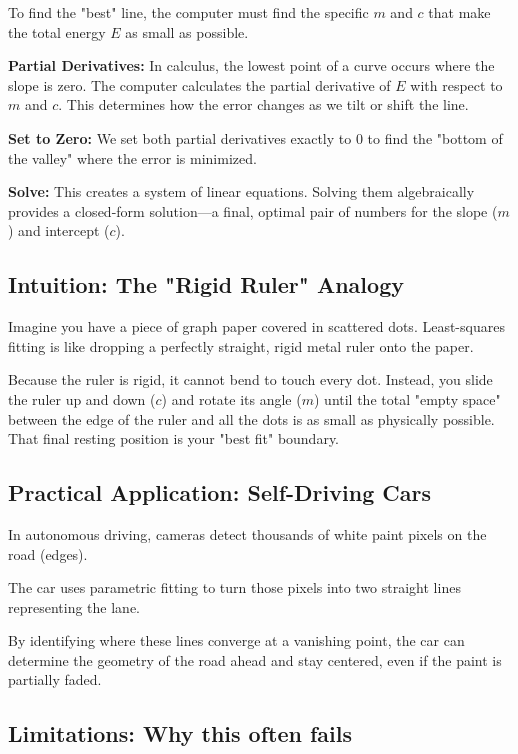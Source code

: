 \documentclass[12pt]{article}
\begin{document}
To find the "best" line, the computer must find the specific $m$ and $c$ that make the total energy $E$ as small as possible.

\textbf{Partial Derivatives:}
In calculus, the lowest point of a curve occurs where the slope is zero. The computer calculates the partial derivative of $E$ with respect to $m$ and $c$. This determines how the error changes as we tilt or shift the line.

\textbf{Set to Zero:}
We set both partial derivatives exactly to $0$ to find the "bottom of the valley" where the error is minimized.

\textbf{Solve:}
This creates a system of linear equations. Solving them algebraically provides a closed-form solution—a final, optimal pair of numbers for the slope ($m$) and intercept ($c$).


\subsection{Intuition: The "Rigid Ruler" Analogy}

Imagine you have a piece of graph paper covered in scattered dots. Least-squares fitting is like dropping a perfectly straight, rigid metal ruler onto the paper.

Because the ruler is rigid, it cannot bend to touch every dot. Instead, you slide the ruler up and down ($c$) and rotate its angle ($m$) until the total "empty space" between the edge of the ruler and all the dots is as small as physically possible. That final resting position is your "best fit" boundary.

\subsection{Practical Application: Self-Driving Cars}

In autonomous driving, cameras detect thousands of white paint pixels on the road (edges).

The car uses parametric fitting to turn those pixels into two straight lines representing the lane.

By identifying where these lines converge at a vanishing point, the car can determine the geometry of the road ahead and stay centered, even if the paint is partially faded.


\subsection{Limitations: Why this often fails}
\end{document}
